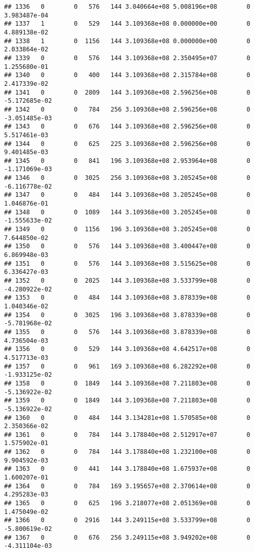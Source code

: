 \documentclass[
]{article}
\begin{document}
\begin{enumerate}
\begin{verbatim}
## 1336   0        0   576   144 3.040664e+08 5.008196e+08        0  3.983487e-04
## 1337   1        0   529   144 3.109368e+08 0.000000e+00        0  4.889138e-02
## 1338   1        0  1156   144 3.109368e+08 0.000000e+00        0  2.033864e-02
## 1339   0        0   576   144 3.109368e+08 2.350495e+07        0  1.255680e-01
## 1340   0        0   400   144 3.109368e+08 2.315784e+08        0  2.417339e-02
## 1341   0        0  2809   144 3.109368e+08 2.596256e+08        0 -5.172685e-02
## 1342   0        0   784   256 3.109368e+08 2.596256e+08        0 -3.051485e-03
## 1343   0        0   676   144 3.109368e+08 2.596256e+08        0  5.517461e-03
## 1344   0        0   625   225 3.109368e+08 2.596256e+08        0  9.401485e-03
## 1345   0        0   841   196 3.109368e+08 2.953964e+08        0 -1.171069e-03
## 1346   0        0  3025   256 3.109368e+08 3.205245e+08        0 -6.116778e-02
## 1347   0        0   484   144 3.109368e+08 3.205245e+08        0  1.046876e-01
## 1348   0        0  1089   144 3.109368e+08 3.205245e+08        0 -1.555633e-02
## 1349   0        0  1156   196 3.109368e+08 3.205245e+08        0  7.644850e-02
## 1350   0        0   576   144 3.109368e+08 3.400447e+08        0  6.869948e-03
## 1351   0        0   576   144 3.109368e+08 3.515625e+08        0  6.336427e-03
## 1352   0        0  2025   144 3.109368e+08 3.533799e+08        0 -4.280922e-02
## 1353   0        0   484   144 3.109368e+08 3.878339e+08        0  1.040346e-02
## 1354   0        0  3025   196 3.109368e+08 3.878339e+08        0 -5.781968e-02
## 1355   0        0   576   144 3.109368e+08 3.878339e+08        0  4.736504e-03
## 1356   0        0   529   144 3.109368e+08 4.642517e+08        0  4.517713e-03
## 1357   0        0   961   169 3.109368e+08 6.282292e+08        0 -1.933125e-02
## 1358   0        0  1849   144 3.109368e+08 7.211803e+08        0 -5.136922e-02
## 1359   0        0  1849   144 3.109368e+08 7.211803e+08        0 -5.136922e-02
## 1360   0        0   484   144 3.134281e+08 1.570585e+08        0  2.350366e-02
## 1361   0        0   784   144 3.178840e+08 2.512917e+07        0  1.575902e-01
## 1362   0        0   784   144 3.178840e+08 1.232100e+08        0  9.904592e-03
## 1363   0        0   441   144 3.178840e+08 1.675937e+08        0  1.600207e-01
## 1364   0        0   784   169 3.195657e+08 2.370614e+08        0  4.295283e-03
## 1365   0        0   625   196 3.218077e+08 2.051369e+08        0  1.475049e-02
## 1366   0        0  2916   144 3.249115e+08 3.533799e+08        0 -5.800619e-02
## 1367   0        0   676   256 3.249115e+08 3.949202e+08        0 -4.311104e-03

\end{verbatim}
\end{enumerate}
\end{document}
